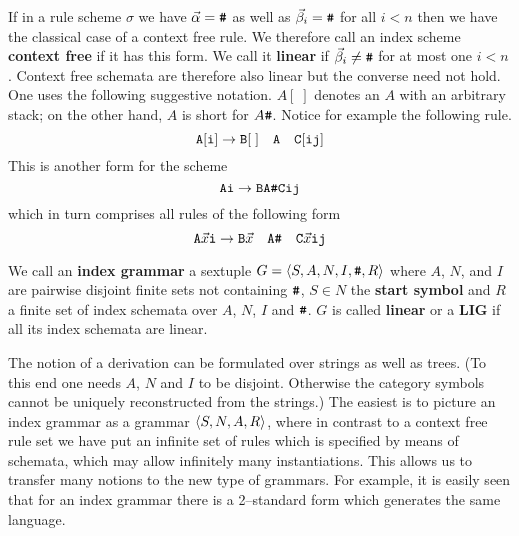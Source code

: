 If in a rule scheme $\sigma$ we have $\vec{\alpha} = \mbox{\tt\#}$
as well as $\vec{\beta}_i = \mbox{\tt\#}$ for all $i < n$ then
we have the classical case of a context free rule. We therefore 
call an index scheme \textbf{context free} 
if it has this form. We call it \textbf{linear} if 
$\vec{\beta}_i \neq \mbox{\tt\#}$ for at 
most one $i < n$. Context free schemata are therefore also
linear but the converse need not hold. One uses the following
suggestive notation. $A[\;]$ denotes an $A$ with an arbitrary
stack; on the other hand, $A$ is short for $A\mbox{\tt\#}$. Notice
for example the following rule.
\begin{equation}
\mbox{\tt A}[\mbox{\tt i}] \rightarrow \mbox{\tt B}[\;] \quad
\mbox{\tt A} \quad \mbox{\tt C}[\mbox{\tt ij}]
\end{equation}
This is another form for the scheme
\begin{equation}
\mbox{\tt Ai} \rightarrow \mbox{\tt BA\#Cij}
\end{equation}
which in turn comprises all rules of the following form
\begin{equation}
\mbox{\tt A}\vec{x}\mbox{\tt i} \rightarrow \mbox{\tt B}\vec{x}
\quad \mbox{\tt A}\mbox{\tt\#}\quad \mbox{\tt C}\vec{x}\mbox{\tt ij}
\end{equation}
\begin{defn}
We call an \textbf{index grammar} a sextuple
$G = \langle S, A, N, I, \mbox{\tt\#}, R\rangle$ where $A$, $N$, and $I$ are
pairwise disjoint finite sets not containing $\mbox{\tt\#}$, $S \in N$
the \textbf{start symbol} and $R$ a finite set of index schemata 
over $A$, $N$, $I$ and $\mbox{\tt\#}$. $G$ is called \textbf{linear} or a 
\textbf{LIG} if all its index schemata are linear.
\end{defn}
The notion of a derivation can be formulated over strings as
well as trees. (To this end one needs $A$, $N$ and $I$ to be
disjoint. Otherwise the category symbols cannot be uniquely
reconstructed from the strings.) The easiest is to picture
an index grammar as a grammar $\langle S, N, A, R\rangle$, where in
contrast to a context free rule set we have put an infinite
set of rules which is specified by means of schemata, which
may allow infinitely many instantiations. This allows us to
transfer many notions to the new type of grammars. For example,
it is easily seen that for an index grammar there is a
2--standard form which generates the same language.


